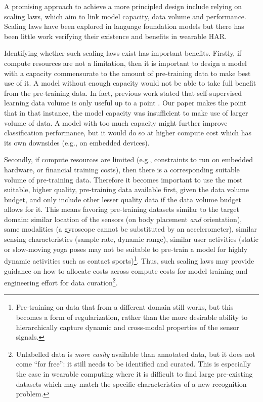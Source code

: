 A promising approach to achieve a more principled design include relying on
scaling laws, which aim to link model capacity, data volume and performance. Scaling laws have been explored in language foundation models \cite{hoffmann2022chinchilla} but there has been little work verifying their existence and benefits in wearable HAR.

Identifying whether such scaling laws exist has important benefits.
Firstly, 
if compute resources are not a limitation, then it is important to design a model with a capacity commensurate to the amount of pre-training data to make best use of it. A model without enough capacity would not be able to take full benefit from the pre-training data. In fact, previous work stated that self-supervised learning data volume is only useful up to a point \cite{assessingSSLHAR22}. Our paper makes the point that in that instance, the model capacity was insufficient to make use of larger volume of data.
A model with too much capacity might further improve classification performance, but it would do so at higher compute cost which has its own downsides (e.g., on embedded devices).

Secondly, 
if compute resources are limited (e.g., constraints to run on embedded hardware, or financial training costs), then there is a corresponding suitable volume of pre-training data. 
Therefore it becomes important to use the most suitable, higher quality, pre-training data available first, given the data volume budget, and only include other lesser quality data if the data volume budget allows for it. 
This means favoring pre-training datasets similar to the target domain: similar location of the sensors (on body placement {\em and} orientation), same modalities (a gyroscope cannot be substituted by an accelerometer), similar sensing characteristics (sample rate, dynamic range), 
similar user activities (static or slow-moving yoga poses may not be suitable to pre-train a model for highly dynamic activities such as contact sports)\footnote{Pre-training on data that from a different domain still works, but this becomes a form of regularization, rather than the more desirable ability to hierarchically capture dynamic and cross-modal properties of the sensor signals.}.
Thus, such scaling laws may provide guidance on how to allocate costs across compute costs for model training and engineering effort for data curation\footnote{Unlabelled data is {\em more easily} available than annotated data, but it does not come ``for free'': it still needs to be identified and curated. This is especially the case in wearable computing where it is difficult to find large pre-existing datasets which may match the specific characteristics of a new recognition problem.
}. 

